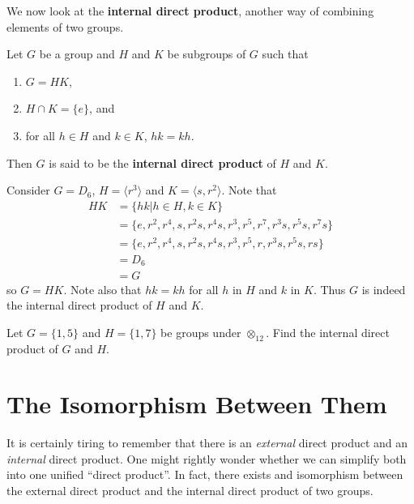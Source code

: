 We now look at the \textbf{internal direct product}, another way of combining elements of two groups.

\begin{definition}
    Let $G$ be a group and $H$ and $K$ be subgroups of $G$ such that
    \begin{enumerate}
        \item $G = HK$,
        \item $H \cap K = \{e\}$, and
        \item for all $h \in H$ and $k \in K$, $hk = kh$.
    \end{enumerate}
    Then $G$ is said to be the \textbf{internal direct product} of $H$ and $K$.
\end{definition}

\begin{example}
    Consider $G = D_6$, $H = \langle r^3 \rangle$ and $K = \langle s, r^2 \rangle$. Note that
    \begin{align*}
        HK &= \{hk \vert h \in H, k \in K\}\\
        &= \{e, r^2, r^4, s, r^2s, r^4s, r^3, r^5, r^7, r^3s, r^5s, r^7s\}\\
        &= \{e, r^2, r^4, s, r^2s, r^4s, r^3, r^5, r, r^3s, r^5s, rs\}\\
        &= D_6\\
        &= G
    \end{align*}
    so $G = HK$. Note also that $hk = kh$ for all $h$ in $H$ and $k$ in $K$. Thus $G$ is indeed the internal direct product of $H$ and $K$.
\end{example}

\begin{exercise}
    Let $G = \{1, 5\}$ and $H = \{1, 7\}$ be groups under $\otimes_{12}$. Find the internal direct product of $G$ and $H$.
\end{exercise}

\newpage

\section{The Isomorphism Between Them}
It is certainly tiring to remember that there is an \textit{external} direct product and an \textit{internal} direct product. One might rightly wonder whether we can simplify both into one unified ``direct product''. In fact, there exists and isomorphism between the external direct product and the internal direct product of two groups.

